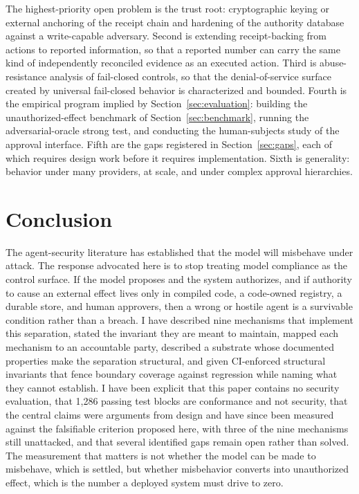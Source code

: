 \documentclass[11pt,letterpaper]{article}
\begin{document}
The highest-priority open problem is the trust root: cryptographic keying or external anchoring of the receipt chain and hardening of the authority database against a write-capable adversary. Second is extending receipt-backing from actions to reported information, so that a reported number can carry the same kind of independently reconciled evidence as an executed action. Third is abuse-resistance analysis of fail-closed controls, so that the denial-of-service surface created by universal fail-closed behavior is characterized and bounded. Fourth is the empirical program implied by Section~\ref{sec:evaluation}: building the unauthorized-effect benchmark of Section~\ref{sec:benchmark}, running the adversarial-oracle strong test, and conducting the human-subjects study of the approval interface. Fifth are the gaps registered in Section~\ref{sec:gaps}, each of which requires design work before it requires implementation. Sixth is generality: behavior under many providers, at scale, and under complex approval hierarchies.

\section{Conclusion}\label{sec:conclusion}

The agent-security literature has established that the model will misbehave under attack. The response advocated here is to stop treating model compliance as the control surface. If the model proposes and the system authorizes, and if authority to cause an external effect lives only in compiled code, a code-owned registry, a durable store, and human approvers, then a wrong or hostile agent is a survivable condition rather than a breach. I have described nine mechanisms that implement this separation, stated the invariant they are meant to maintain, mapped each mechanism to an accountable party, described a substrate whose documented properties make the separation structural, and given CI-enforced structural invariants that fence boundary coverage against regression while naming what they cannot establish. I have been explicit that this paper contains no security evaluation, that 1,286 passing test blocks are conformance and not security, that the central claims were arguments from design and have since been measured against the falsifiable criterion proposed here, with three of the nine mechanisms still unattacked, and that several identified gaps remain open rather than solved. The measurement that matters is not whether the model can be made to misbehave, which is settled, but whether misbehavior converts into unauthorized effect, which is the number a deployed system must drive to zero.
\end{document}
